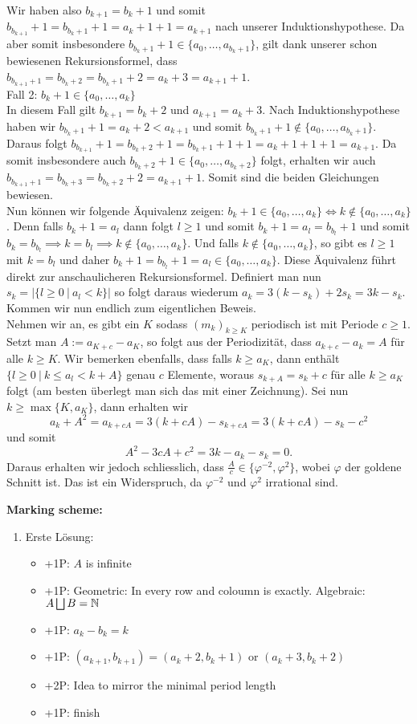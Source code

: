 Wir haben also $b_{k+1}=b_k+1$ und somit $b_{b_{k+1}}+1=b_{b_k+1}+1=a_k+1+1=a_{k+1}$ nach unserer Induktionshypothese. Da aber somit insbesondere $b_{b_k+1}+1\in\{a_0,…,a_{b_k+1}\}$, gilt dank unserer schon bewiesenen Rekursionsformel, dass $b_{b_{k+1}+1}=b_{b_k+2}=b_{b_k+1}+2=a_k+3=a_{k+1}+1$.\\
Fall 2: $b_k+1\in\{a_0,…,a_k\}$\\
In diesem Fall gilt $b_{k+1}=b_k+2$ und $a_{k+1}=a_k+3$. Nach Induktionshypothese haben wir $b_{b_k+1}+1=a_k+2<a_{k+1}$ und somit $b_{b_k+1}+1\notin\{a_0,…,a_{b_k+1}\}$. Daraus folgt $b_{b_{k+1}}+1=b_{b_k+2}+1=b_{b_k+1}+1+1=a_k+1+1+1=a_{k+1}$. Da somit insbesondere auch $b_{b_k+2}+1\in\{a_0,…,a_{b_k+2}\}$ folgt, erhalten wir auch $b_{b_{k+1}+1}=b_{b_k+3}=b_{b_k+2}+2=a_{k+1}+1$. Somit sind die beiden Gleichungen bewiesen.\\
Nun können wir folgende Äquivalenz zeigen: $b_k+1\in\{a_0,…,a_k\}\iff k\notin\{a_0,…,a_k\}$. Denn falls $b_k+1=a_l$ dann folgt $l\geq 1$ und somit $b_k+1=a_l=b_{b_l}+1$ und somit $b_k=b_{b_l}\implies k=b_l\implies k\notin\{a_0,…,a_k\}$. Und falls $k\notin\{a_0,…,a_k\}$, so gibt es $l\geq 1$ mit $k=b_l$ und daher $b_k+1=b_{b_l}+1=a_l\in\{a_0,…,a_k\}$. Diese Äquivalenz führt direkt zur anschaulicheren Rekursionsformel. Definiert man nun $s_k=|\{l\geq 0\ |\ a_l<k\}|$ so folgt daraus wiederum $a_k=3(k-s_k)+2s_k=3k-s_k$. Kommen wir nun endlich zum eigentlichen Beweis.\\
Nehmen wir an, es gibt ein $K$ sodass $(m_k)_{k\geq K}$ periodisch ist mit Periode $c\geq 1$. Setzt man $A:=a_{K+c}-a_K$, so folgt aus der Periodizität, dass $a_{k+c}-a_k=A$ für alle $k\geq K$. Wir bemerken ebenfalls, dass falls $k\geq a_K$, dann enthält $\{l\geq 0\ |\ k\leq a_l<k+A\}$ genau $c$ Elemente, woraus $s_{k+A}=s_k+c$ für alle $k\geq a_K$ folgt (am besten überlegt man sich das mit einer Zeichnung). Sei nun $k\geq\max\{K,a_K\}$, dann erhalten wir
$$
a_k+A^2=a_{k+cA}=3(k+cA)-s_{k+cA}=3(k+cA)-s_k-c^2
$$
und somit
$$
A^2-3cA+c^2=3k-a_k-s_k=0.
$$
Daraus erhalten wir jedoch schliesslich, dass $\frac{A}{c}\in\{\varphi^{-2},\varphi^2\}$, wobei $\varphi$ der goldene Schnitt ist. Das ist ein Widerspruch, da $\varphi^{-2}$ und $\varphi^2$ irrational sind.

\newpage
\textbf{Marking scheme:}

\begin{enumerate}
    \item Erste Lösung:
\begin{itemize}
    \item +1P: $A$ is infinite
    \item +1P: Geometric: In every row and coloumn is exactly. Algebraic: $A \bigsqcup B = \mathbb{N}$
    \item +1P: $a_k - b_k = k$
    \item +1P: $(a_{k+1},b_{k+1}) = (a_k +2, b_k +1)$ or $(a_k+3,b_k+2)$
    \item +2P: Idea to mirror the minimal period length
    \item +1P: finish
\end{itemize}
\end{enumerate}